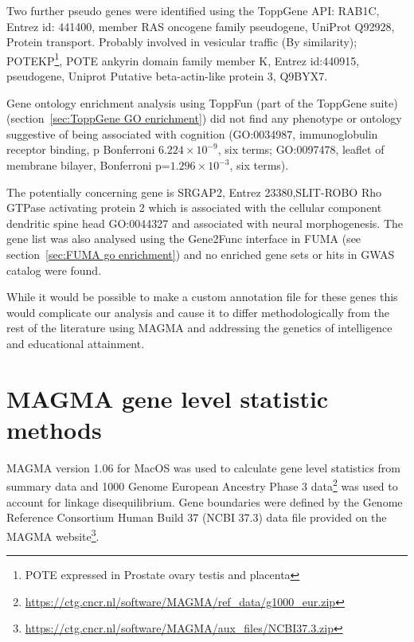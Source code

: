 Two further pseudo genes were identified using the ToppGene API\cite{chen2009toppgene}:  RAB1C, Entrez id:	441400, member RAS oncogene family pseudogene, UniProt Q92928, Protein transport. Probably involved in vesicular traffic (By similarity); POTEKP\footnote{POTE expressed in Prostate ovary testis and placenta}, POTE ankyrin domain family member K, Entrez id:440915, pseudogene\cite{bera2002pote}, Uniprot Putative beta-actin-like protein 3, Q9BYX7. 


Gene ontology enrichment analysis using ToppFun (part of the ToppGene suite) (section~\ref{sec:ToppGene GO enrichment}) did not find any phenotype or ontology suggestive of being associated with cognition  (GO:0034987,	immunoglobulin receptor binding, 	p Bonferroni $6.224\times10^{-9}$,	six terms; 	GO:0097478,	leaflet of membrane bilayer,	Bonferroni p=$1.296\times10^{-3}$,	six	terms). 

The potentially concerning gene is SRGAP2, Entrez 23380,SLIT-ROBO Rho GTPase activating protein 2 which is associated with the cellular component dendritic spine head GO:0044327 and associated with neural morphogenesis\cite{guerrier2009f}. The gene list was also analysed using the Gene2Func interface in FUMA \cite{watanabe2017functional} (see section~\ref{sec:FUMA go enrichment}) and no enriched gene sets or hits in GWAS catalog\cite{welter2014nhgri} were found.

 While it would be possible to make a custom annotation file for these genes this would complicate our analysis and cause it to differ methodologically from the rest of the literature using MAGMA and addressing the genetics of intelligence and educational attainment.
 

   




\section{MAGMA gene level statistic methods}
\label{sec:MAGMA gene level methods}
MAGMA version 1.06 for MacOS was used to calculate gene level statistics from summary data and 1000 Genome European Ancestry Phase 3 data\footnote{\url{https://ctg.cncr.nl/software/MAGMA/ref_data/g1000_eur.zip}} was used to account for linkage  disequilibrium. Gene boundaries were defined by the Genome Reference Consortium Human Build 37 (NCBI 37.3) data file provided on the MAGMA website\footnote{\url{https://ctg.cncr.nl/software/MAGMA/aux_files/NCBI37.3.zip}}.

